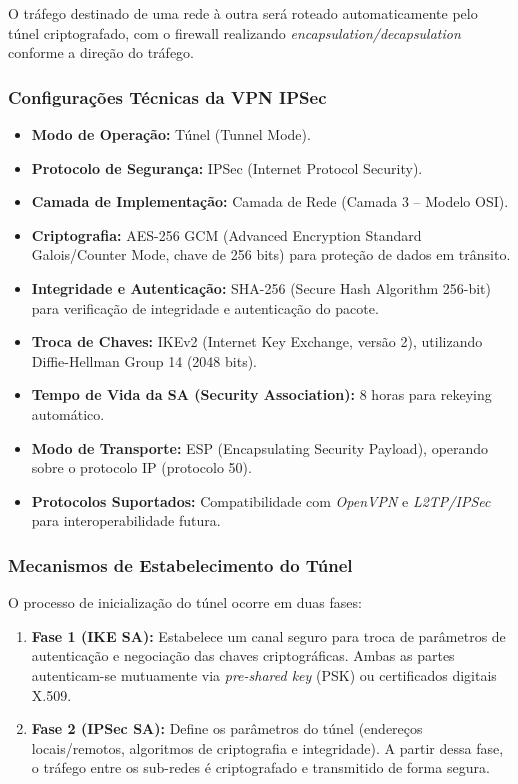 \documentclass[a4paper, 12pt]{article}
\begin{document}
O tráfego destinado de uma rede à outra será roteado automaticamente pelo túnel criptografado, com o firewall realizando \textit{encapsulation/decapsulation} conforme a direção do tráfego.

\subsubsection{Configurações Técnicas da VPN IPSec}
\label{subsubsec:vpn-config}

\begin{itemize}
    \item \textbf{Modo de Operação:} Túnel (Tunnel Mode).
    \item \textbf{Protocolo de Segurança:} IPSec (Internet Protocol Security).
    \item \textbf{Camada de Implementação:} Camada de Rede (Camada 3 – Modelo OSI).
    \item \textbf{Criptografia:} AES-256 GCM (Advanced Encryption Standard Galois/Counter Mode, chave de 256 bits) para proteção de dados em trânsito.
    \item \textbf{Integridade e Autenticação:} SHA-256 (Secure Hash Algorithm 256-bit) para verificação de integridade e autenticação do pacote.
    \item \textbf{Troca de Chaves:} IKEv2 (Internet Key Exchange, versão 2), utilizando Diffie-Hellman Group 14 (2048 bits).
    \item \textbf{Tempo de Vida da SA (Security Association):} 8 horas para rekeying automático.
    \item \textbf{Modo de Transporte:} ESP (Encapsulating Security Payload), operando sobre o protocolo IP (protocolo 50).
    \item \textbf{Protocolos Suportados:} Compatibilidade com \textit{OpenVPN} e \textit{L2TP/IPSec} para interoperabilidade futura.
\end{itemize}

\subsubsection{Mecanismos de Estabelecimento do Túnel}
\label{subsubsec:vpn-handshake}

O processo de inicialização do túnel ocorre em duas fases:
\begin{enumerate}
    \item \textbf{Fase 1 (IKE SA):} Estabelece um canal seguro para troca de parâmetros de autenticação e negociação das chaves criptográficas. Ambas as partes autenticam-se mutuamente via \textit{pre-shared key} (PSK) ou certificados digitais X.509.
    \item \textbf{Fase 2 (IPSec SA):} Define os parâmetros do túnel (endereços locais/remotos, algoritmos de criptografia e integridade). A partir dessa fase, o tráfego entre os sub-redes é criptografado e transmitido de forma segura.
\end{enumerate}
\end{document}
